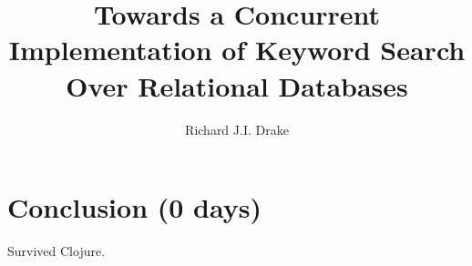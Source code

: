 \documentclass[grad]{uoit-thesis}
\author{Richard J.I. Drake}
\title{Towards a Concurrent Implementation of Keyword Search Over Relational Databases}
\begin{document}
	
	
	
	\begin{preliminary}
		\maketitle

		\setcounter{page}{3}

		\tableofcontents

		\listoftables
		\listoffigures
		\listofalgorithms
		\printglossaries
	\end{preliminary}
	
	
	
	
	
	
	
	
	
	
	
	\chapter{Conclusion (0 days)}
		Survived Clojure.

	\appendix
	
	\begin{singlespaced}
		
	\end{singlespaced}
	
	\printbibliography
	
	\todos
\end{document}
